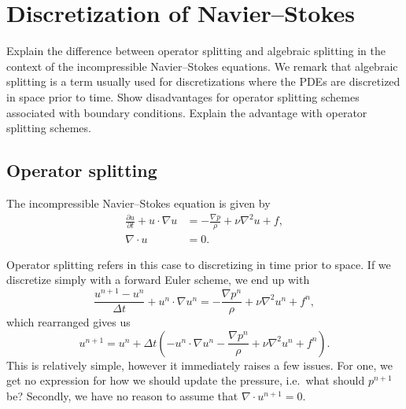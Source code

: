 \section{Discretization of Navier--Stokes} %
Explain the difference between operator splitting and algebraic splitting in the context of the incompressible Navier--Stokes equations. %
We remark that algebraic splitting is a term usually used for discretizations where the PDEs are discretized in space prior to time.
Show disadvantages for operator splitting schemes associated with boundary conditions.
Explain the advantage with operator splitting schemes.

\subsection{Operator splitting} %
The incompressible Navier--Stokes equation is given by %
\begin{equation}
    \begin{split}
        \frac{\partial u}{\partial t} + u \cdot \nabla u
        &= -\frac{\nabla p}{\rho} + \nu \nabla^2 u + f, \\
        \nabla \cdot u &= 0.
    \end{split}
\end{equation}

Operator splitting refers in this case to discretizing in time prior to space.
If we discretize simply with a forward Euler scheme, we end up with
\begin{equation}
    \frac{u^{n+1} - u^n}{\Delta t} + u^n \cdot \nabla u^n
    = -\frac{\nabla p^n}{\rho} + \nu \nabla^2 u^n + f^n,
\end{equation}
which rearranged gives us
\begin{equation}
    u^{n+1} = u^n + \Delta t \left(
        - u^n \cdot \nabla u^n
        -\frac{\nabla p^n}{\rho}
        + \nu \nabla^2 u^n
        + f^n
    \right).
\end{equation}
This is relatively simple, however it immediately raises a few issues.
For one, we get no expression for how we should update the pressure, i.e.\ what should $p^{n+1}$ be?
Secondly, we have no reason to assume that $\nabla \cdot u^{n+1} = 0$.

